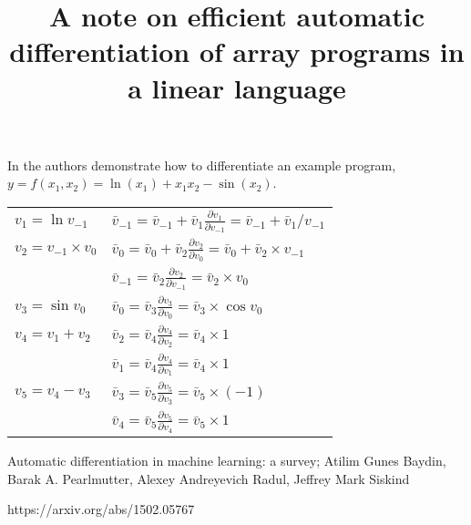 \documentclass[12pt]{article}
\title{A note on efficient automatic differentiation of array programs
  in a linear language}
\begin{document}
\maketitle

In \cite{adml} the authors demonstrate how to differentiate an example
program, $y = f(x_1, x_2) = \ln(x_1)+x_1 x_2-\sin(x_2)$.

  \newcommand{\diff}[2]{
    \bar{v}_{#1} \frac{\partial v_{#1}}{\partial v_{#2}}
  }

\begin{tabular}[t]{ll}

  $v_1 = \ln{v_{-1}}$
  &
  \(\bar{v}_{-1}
  = \bar{v}_{-1} + \diff{1}{-1}
  = \bar{v}_{-1} + \bar{v}_1 / v_{-1}
  \) \\

  $v_2 = v_{-1} \times v_0$
  &
  \(\bar{v}_0
  = \bar{v}_0 + \diff{2}{0}
  = \bar{v}_0 + \bar{v}_2 \times v_{-1}
  \) \\

  &
  \(\bar{v}_{-1}
  = \diff{2}{-1}
  = \bar{v}_2 \times v_{0}
  \) \\

  $v_3 = \sin{v_0}$
  &
  \(\bar{v}_0
  = \diff{3}{0}
  = \bar{v}_3 \times \cos v_0
  \) \\

  $v_4 = v_1 + v_2$
  &
  \(\bar{v}_2
  = \diff{4}{2}
  = \bar{v}_4 \times 1
  \) \\

  &
  \(\bar{v}_1
  = \diff{4}{1}
  = \bar{v}_4 \times 1
  \) \\

  $v_5 = v_4 - v_3$
  &
  \(\bar{v}_3
  = \diff{5}{3}
  = \bar{v}_5 \times (-1)
  \) \\
  
  &
  \(\bar{v}_4
  = \diff{5}{4}
  = \bar{v}_5 \times 1
  \) \\
  
\end{tabular}




\begin{thebibliography}{9}

  Automatic differentiation in machine learning: a survey;
  Atilim Gunes Baydin, Barak A. Pearlmutter, Alexey Andreyevich Radul, Jeffrey Mark Siskind
  
https://arxiv.org/abs/1502.05767
  
\end{thebibliography}
\end{document}

